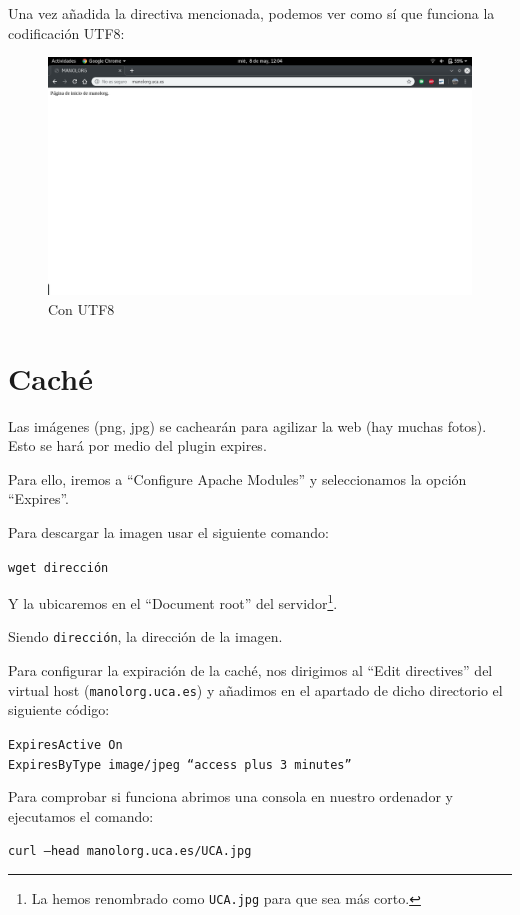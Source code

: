 \documentclass[12pt,letterpaper]{article}
\begin{document}
\newpage
Una vez añadida la directiva mencionada, podemos ver como sí que funciona la codificación UTF8:
\begin{figure}[h]
	\centering
	\includegraphics[scale=0.34]{ConUTF8.png}
	\caption{Con UTF8}
	\label{Con UTF8}
\end{figure}

\section{Caché}
Las imágenes (png, jpg) se cachearán para agilizar la web (hay muchas fotos). Esto se hará por medio del plugin expires.

Para ello, iremos a ``Configure Apache Modules'' y seleccionamos la opción ``Expires''.

Para descargar la imagen usar el siguiente comando:
\begin{center}
	\texttt{wget dirección}
\end{center}

Y la ubicaremos en el ``Document root'' del servidor\footnote{La hemos renombrado como \texttt{UCA.jpg} para que sea más corto.}.

Siendo \texttt{dirección}, la dirección de la imagen.

Para configurar la expiración de la caché, nos dirigimos al ``Edit directives'' del virtual host (\texttt{manolorg.uca.es}) y añadimos en el apartado de dicho directorio el siguiente código:
\begin{center}
	\texttt{ExpiresActive On\\
		ExpiresByType image/jpeg ``access plus 3 minutes''}
\end{center}

Para comprobar si funciona abrimos una consola en nuestro ordenador y ejecutamos el comando:
\begin{center}
	\texttt{curl ---head manolorg.uca.es/UCA.jpg}
\end{center}
\end{document}
